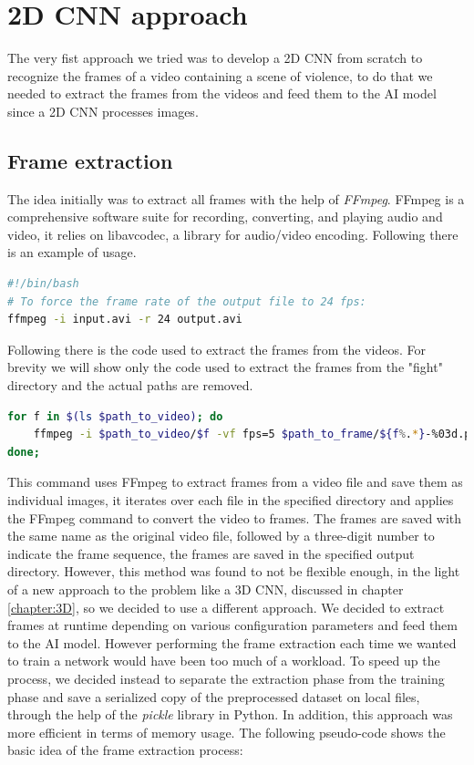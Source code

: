 \chapter{2D CNN approach}
The very fist approach we tried was to develop a 2D CNN from scratch to recognize the frames of a video containing a scene of violence, to do that we needed to extract the frames from the videos and feed them to the AI model since a 2D CNN processes images.
\section{Frame extraction}
\label{framextraction}
The idea initially was to extract all frames with the help of \textit{FFmpeg}. FFmpeg is a comprehensive software suite for recording, converting, and playing audio and video, it relies on libavcodec, a library for audio/video encoding. Following there is an example of usage.
\begin{lstlisting}[language=bash, caption={FFmpeg example}, label={lst:FFmpegExample}]
#!/bin/bash
# To force the frame rate of the output file to 24 fps:
ffmpeg -i input.avi -r 24 output.avi
\end{lstlisting}

Following there is the code used to extract the frames from the videos. For brevity we will show only the code used to extract the frames from the "fight" directory and the actual paths are removed.
\begin{lstlisting}[language=bash, caption={Frame extraction}, label={lst:FrameExtraction}]
for f in $(ls $path_to_video); do 
	ffmpeg -i $path_to_video/$f -vf fps=5 $path_to_frame/${f%.*}-%03d.png; 
done;
\end{lstlisting}

This command uses FFmpeg to extract frames from a video file and save them as individual images, it iterates over each file in the specified directory and applies the FFmpeg command to convert the video to frames. The frames are saved with the same name as the original video file, followed by a three-digit number to indicate the frame sequence, the frames are saved in the specified output directory.
However, this method was found to not be flexible enough, in the light of a new approach to the problem like a 3D CNN, discussed in chapter \ref{chapter:3D}, so we decided to use a different approach. We decided to extract frames at runtime depending on various configuration parameters and feed them to the AI model. However performing the frame extraction each time we wanted to train a network would have been too much of a workload. To speed up the process, we decided instead to separate the extraction phase from the training phase and save a serialized copy of the preprocessed dataset on local files, through the help of the \textit{pickle} library in Python. In addition, this approach was more efficient in terms of memory usage.
The following pseudo-code shows the basic idea of the frame extraction process:

